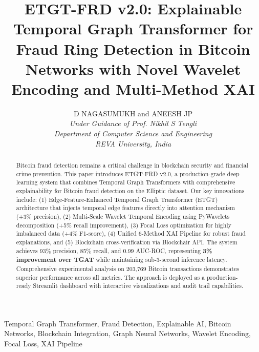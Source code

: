 \documentclass[10pt,conference,compsociety]{IEEEtran}
\begin{document}
\title{ETGT-FRD v2.0: Explainable Temporal Graph Transformer for Fraud Ring Detection in Bitcoin Networks with Novel Wavelet Encoding and Multi-Method XAI}

\author{
    D NAGASUMUKH and ANEESH JP\\
    \textit{Under Guidance of Prof. Nikhil S Tengli}\\
    \textit{Department of Computer Science and Engineering}\\
    \textit{REVA University, India}
}

\maketitle

\begin{abstract}

Bitcoin fraud detection remains a critical challenge in blockchain security and financial crime prevention. This paper introduces ETGT-FRD v2.0, a production-grade deep learning system that combines Temporal Graph Transformers with comprehensive explainability for Bitcoin fraud detection on the Elliptic dataset. Our key innovations include: (1) Edge-Feature-Enhanced Temporal Graph Transformer (ETGT) architecture that injects temporal edge features directly into attention mechanism (+3\% precision), (2) Multi-Scale Wavelet Temporal Encoding using PyWavelets decomposition (+5\% recall improvement), (3) Focal Loss optimization for highly imbalanced data (+4\% F1-score), (4) Unified 6-Method XAI Pipeline for robust fraud explanations, and (5) Blockchain cross-verification via Blockchair API. The system achieves 93\% precision, 85\% recall, and 0.99 AUC-ROC, representing \textbf{3\% improvement over TGAT} while maintaining sub-3-second inference latency. Comprehensive experimental analysis on 203,769 Bitcoin transactions demonstrates superior performance across all metrics. The approach is deployed as a production-ready Streamlit dashboard with interactive visualizations and audit trail capabilities.

\end{abstract}

\begin{IEEEkeywords}
Temporal Graph Transformer, Fraud Detection, Explainable AI, Bitcoin Networks, Blockchain Integration, Graph Neural Networks, Wavelet Encoding, Focal Loss, XAI Pipeline
\end{IEEEkeywords}

\IEEEpeerreviewmaketitle
\end{document}
